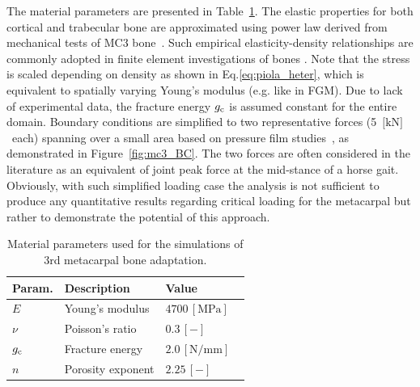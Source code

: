 \documentclass[onecolumn]{svjour3}
\begin{document}
The material parameters are presented in Table~\ref{tab:parameters_mc3}. The elastic properties for both cortical and trabecular bone are approximated using power law derived from mechanical tests of MC3 bone~\cite{Les1994}. 
Such empirical elasticity-density relationships are commonly adopted in finite element investigations of bones \citep{helgason2008mathematical}. Note that the stress is scaled depending on density as shown in Eq.\ref{eq:piola_heter}, which is equivalent to spatially varying Young's modulus (e.g. like in FGM). Due to lack of experimental data, the fracture energy $g_{\text c}$ is assumed constant for the entire domain. 
Boundary conditions are simplified to two representative forces (5~$\text{[kN]}$~each) spanning over a small area based on pressure film studies~\cite{Brama2001}, as demonstrated in Figure~\ref{fig:mc3_BC}. 
The two forces are often considered in the literature as an equivalent of joint peak force at the mid-stance of a horse gait. Obviously, with such simplified loading case the analysis is not sufficient to produce any quantitative results regarding critical loading for the metacarpal but rather to demonstrate the potential of this approach. 
\begin{table}[h]
	\centering
	\begin{tabular}{lll}
		\hline
		 Param.             & Description                  & Value  \\ \hline
		$E  $                 & Young's modulus              & $4700 \,\mathrm{ [MPa]}$ ~\cite{Les1994} \\
		$\nu  $               & Poisson's ratio                & $0.3 \,\mathrm{ [-]}$ \\
		$g_{\text c}$					&	Fracture energy							 &  $2.0\,[\mathrm{ N/mm}]$ \\
		$n$                   & Porosity exponent            & $2.25 \,\mathrm{ [-]}$     ~\cite{Les1994}   \\ 
		\hline
	\end{tabular} 
	\caption{Material parameters used for the simulations of 3rd metacarpal bone adaptation.}
	\label{tab:parameters_mc3}
\end{table}
\end{document}
